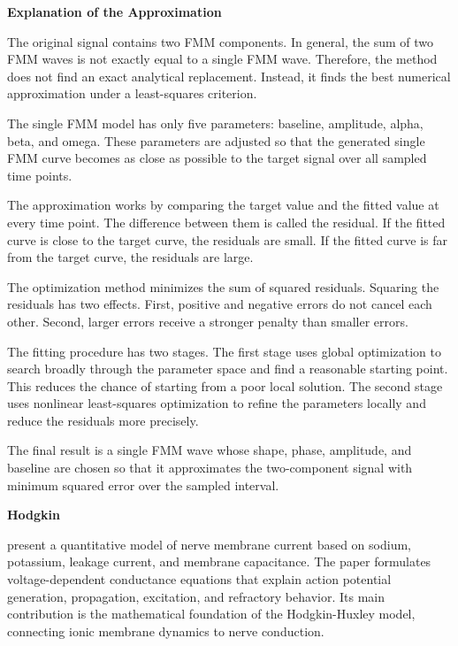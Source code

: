 \documentclass{book}
\providecommand{\ProjectDeepHeading}[2]{%
    \par\medskip\noindent\textbf{#2}\par\smallskip
}
\begin{document}
    
    \ProjectDeepHeading{11}{Explanation of the Approximation}
        
        The original signal contains two FMM components. In general, the sum of two FMM waves is not exactly equal to a single FMM wave. Therefore, the method does not find an exact analytical replacement. Instead, it finds the best numerical approximation under a least-squares criterion.
        
        The single FMM model has only five parameters: baseline, amplitude, alpha, beta, and omega. These parameters are adjusted so that the generated single FMM curve becomes as close as possible to the target signal over all sampled time points.
        
        The approximation works by comparing the target value and the fitted value at every time point. The difference between them is called the residual. If the fitted curve is close to the target curve, the residuals are small. If the fitted curve is far from the target curve, the residuals are large.
        
        The optimization method minimizes the sum of squared residuals. Squaring the residuals has two effects. First, positive and negative errors do not cancel each other. Second, larger errors receive a stronger penalty than smaller errors.
        
        The fitting procedure has two stages. The first stage uses global optimization to search broadly through the parameter space and find a reasonable starting point. This reduces the chance of starting from a poor local solution. The second stage uses nonlinear least-squares optimization to refine the parameters locally and reduce the residuals more precisely.
        
        The final result is a single FMM wave whose shape, phase, amplitude, and baseline are chosen so that it approximates the two-component signal with minimum squared error over the sampled interval.


%        
%

\ProjectDeepHeading{8}{Hodgkin}


\cite{hodgkin-1952-a-quantitative-description-of-membrane-current-and-its-application-to-conduction-and-excitation-in-nerve} present a quantitative model of nerve membrane current based on sodium, potassium, leakage current, and membrane capacitance.
    The paper formulates voltage-dependent conductance equations that explain action potential generation, propagation, excitation, and refractory behavior.
    Its main contribution is the mathematical foundation of the Hodgkin-Huxley model, connecting ionic membrane dynamics to nerve conduction.
\end{document}

